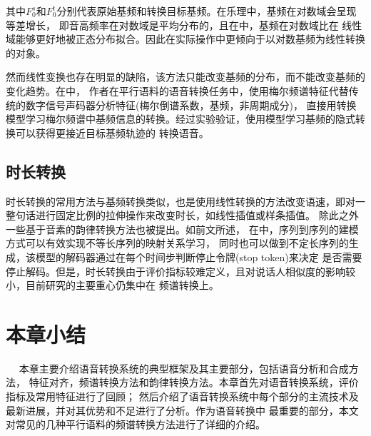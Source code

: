 其中$F_0^s$和$F_0^t$分别代表原始基频和转换目标基频。在乐理中，基频在对数域会呈现等差增长，
即音高频率在对数域是平均分布的，且在\cite{erro2009voice}中，基频在对数域比在
线性域能够更好地被正态分布拟合。因此在实际操作中更倾向于以对数基频为线性转换的对象。

然而线性变换也存在明显的缺陷，该方法只能改变基频的分布，而不能改变基频的变化趋势。在\cite{chen2018high}中，
作者在平行语料的语音转换任务中，使用梅尔频谱特征代替传统的数字信号声码器分析特征(梅尔倒谱系数，基频，非周期成分)，
直接用转换模型学习梅尔频谱中基频信息的转换。经过实验验证，使用模型学习基频的隐式转换可以获得更接近目标基频轨迹的
转换语音。

\subsection{时长转换}
时长转换的常用方法与基频转换类似，也是使用线性转换的方法改变语速，即对一整句话进行固定比例的拉伸操作来改变时长，如线性插值或样条插值。
除此之外一些基于音素的韵律转换方法也被提出\cite{helander2007novel}。如前文所述，
在\cite{tanaka2019atts2s}中，序列到序列的建模方式可以有效实现不等长序列的映射关系学习，
同时也可以做到不定长序列的生成，该模型的解码器通过在每个时间步判断停止令牌(stop token)来决定
是否需要停止解码。但是，时长转换由于评价指标较难定义，且对说话人相似度的影响较小，目前研究的主要重心仍集中在
频谱转换上。

\section{本章小结}　
本章主要介绍语音转换系统的典型框架及其主要部分，包括语音分析和合成方法，
特征对齐，频谱转换方法和韵律转换方法。本章首先对语音转换系统，评价指标及常用特征进行了回顾；
然后介绍了语音转换系统中每个部分的主流技术及最新进展，并对其优势和不足进行了分析。作为语音转换中
最重要的部分，本文对常见的几种平行语料的频谱转换方法进行了详细的介绍。